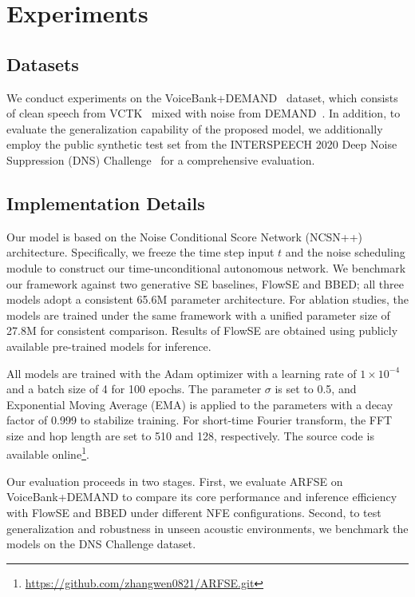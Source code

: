 \documentclass[cameraready]{Interspeech}
\begin{document}
\section{Experiments}
\subsection{Datasets}
We conduct experiments on the VoiceBank+DEMAND~\cite{botinhao2016investigating} dataset, which consists of clean speech from VCTK~\cite{veaux2013voice} mixed with noise from DEMAND~\cite{thiemann2013diverse}. In addition, to evaluate the generalization capability of the proposed model, we additionally employ the public synthetic test set from the INTERSPEECH 2020 Deep Noise Suppression (DNS) Challenge~\cite{reddy20_interspeech} for a comprehensive evaluation.

\subsection{Implementation Details}
Our model is based on the Noise Conditional Score Network (NCSN++)~\cite{lemercier2023storm} architecture. Specifically, we freeze the time step input $t$ and the noise scheduling module to construct our time-unconditional autonomous network. We benchmark our framework against two generative SE baselines, FlowSE and BBED; all three models adopt a consistent 65.6M parameter architecture. For ablation studies, the models are trained under the same framework with a unified parameter size of 27.8M for consistent comparison. Results of FlowSE are obtained using publicly available pre-trained models for inference.

All models are trained with the Adam optimizer with a learning rate of $1 \times 10^{-4}$ and a batch size of 4 for 100 epochs. The parameter $\sigma$ is set to 0.5, and Exponential Moving Average (EMA) is applied to the parameters with a decay factor of 0.999 to stabilize training. For short-time Fourier transform, the FFT size and hop length are set to 510 and 128, respectively. The source code is available online\footnote{\url{https://github.com/zhangwen0821/ARFSE.git}}.

Our evaluation proceeds in two stages. First, we evaluate ARFSE on VoiceBank+DEMAND to compare its core performance and inference efficiency with FlowSE and BBED under different NFE configurations. Second, to test generalization and robustness in unseen acoustic environments, we benchmark the models on the DNS Challenge dataset. 
\end{document}
